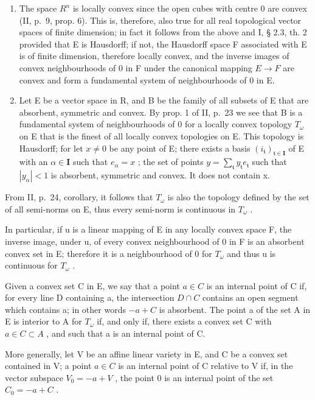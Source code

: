 \begin{enumerate}
\def\labelenumi{\arabic{enumi})}
\item
  The space \(R^{n}\) is locally convex since the open cubes with centre 0 are convex (II, p.~9, prop. 6). This is, therefore, also true for all real topological vector spaces of finite dimension; in fact it follows from the above and I, § 2.3, th. 2 provided that E is Hausdorff; if not, the Hausdorff space F associated with E is of finite dimension, therefore locally convex, and the inverse images of convex neighbourhoods of 0 in F under the canonical mapping \(E \rightarrow F\) are convex and form a fundamental system of neighbourhoods of 0 in E.
\item
  Let E be a vector space in R, and B be the family of all subsets of E that are absorbent, symmetric and convex. By prop. 1 of II, p.~23 we see that B is a fundamental system of neighbourhoods of 0 for a locally convex topology \(T_{\omega}\) on E that is the finest of all locally convex topologies on E. This topology is Hausdorff; for let \(x \neq 0\) be any point of E; there exists a basis \((i_{\mathfrak{t}})_{\mathfrak{t} \in \mathbf{I}}\) of E with an \(\alpha \in \mathbf{I}\) such that \(e_{\alpha} = x\) ; the set of points \(y = \sum_{\mathfrak{t}} y_{\mathfrak{t}} e_{\mathfrak{t}}\) such that \(|y_{\alpha}| < 1\) is absorbent, symmetric and convex. It does not contain x.
\end{enumerate}

From II, p.~24, corollary, it follows that \(T_{\omega}\) is also the topology defined by the set of all semi-norms on E, thus every semi-norm is continuous in \(T_{\omega}\) .

In particular, if u is a linear mapping of E in any locally convex space F, the inverse image, under u, of every convex neighbourhood of 0 in F is an absorbent convex set in E; therefore it is a neighbourhood of 0 for \(T_{\omega}\) and thus u is continuous for \(T_{\omega}\) .

Given a convex set C in E, we say that a point \(a \in C\) is an internal point of C if, for every line D containing a, the intersection \(D \cap C\) contains an open segment which contains a; in other words \(-a + C\) is absorbent. The point a of the set A in E is interior to A for \(T_{\omega}\) if, and only if, there exists a convex set C with \(a \in C \subset A\) , and such that a is an internal point of C.

More generally, let V be an affine linear variety in E, and C be a convex set contained in V; a point \(a \in C\) is an internal point of C relative to V if, in the vector subspace \(V_{0} = -a + V\) , the point 0 is an internal point of the set \(C_{0} = -a + C\) .

